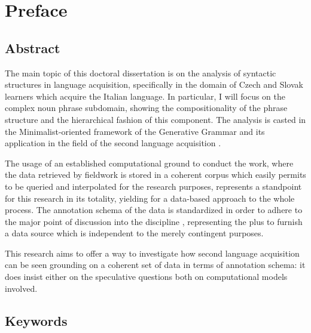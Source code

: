 \documentclass[
  a4paper,
  twoside,
  12pt,
  chapterprefix=false,
  bibliography=totocnumbered,
  listof=flat]{scrbook}
\begin{document}
{
\setcounter{tocdepth}{1}
\tableofcontents
}
\listoftables
\listoffigures
\hypertarget{preface}{%
\chapter*{Preface}\label{preface}}

\hypertarget{abstract}{%
\section*{Abstract}\label{abstract}}

The main topic of this doctoral dissertation is on the analysis of syntactic structures in language acquisition, specifically in the domain of Czech and Slovak learners which acquire the Italian language. In particular, I will focus on the complex noun phrase subdomain, showing the compositionality of the phrase structure and the hierarchical fashion of this component.
The analysis is casted in the Minimalist-oriented framework of the Generative Grammar \citep{chomsky1995, chomsky1998, chomsky2013, hcf2002} and its application in the field of the second language acquisition \citep{rothmanslabakova2017, slabakovalealliskin2014}.

The usage of an established computational ground to conduct the work, where the data retrieved by fieldwork is stored in a coherent corpus which easily permits to be queried and interpolated for the research purposes, represents a standpoint for this research in its totality, yielding for a data-based approach to the whole process.
The annotation schema of the data is standardized in order to adhere to the major point of discussion into the discipline \citep{clark2010, kueblerzinsmeinster2015, kurdi2016}, representing the plus to furnish a data source which is independent to the merely contingent purposes.

This research aims to offer a way to investigate how second language acquisition can be seen grounding on a coherent set of data in terms of annotation schema: it does insist either on the speculative questions both on computational models involved.

\hypertarget{keywords}{%
\section*{Keywords}\label{keywords}}
\end{document}
